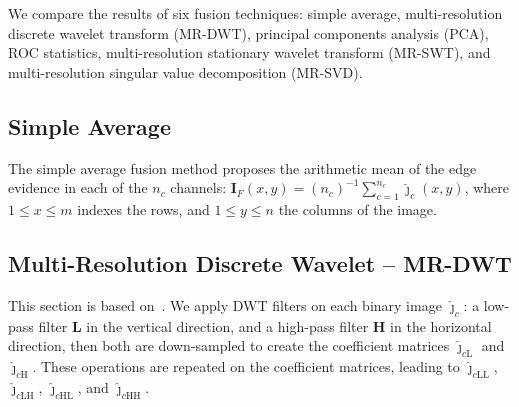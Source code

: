 \documentclass[journal]{IEEEtran}
\begin{document}
We compare the results of six fusion techniques:
simple average, 
multi-resolution discrete wavelet transform (MR-DWT),
principal components analysis (PCA), 
ROC statistics,
multi-resolution stationary wavelet transform (MR-SWT), and
multi-resolution singular value decomposition (MR-SVD).



\subsection{Simple Average}
The simple average fusion method proposes the arithmetic mean of the edge evidence in each of the $n_c$ channels:
$\bm I_F(x,y)=(n_c)^{-1}\sum_{c=1}^{n_c} \widehat{\bm\jmath}_c(x,y)$,
where $1\leq x\leq m$ indexes the rows, and $1\leq y\leq n$ the columns of the image.

\subsection{Multi-Resolution Discrete Wavelet -- MR-DWT} 
This section is based on~\cite{n_r}.
We apply DWT filters on each binary image $\bm{\widehat\jmath}_c$: a low-pass filter $\bm L$ in the vertical direction, and a high-pass filter $\bm H$ in the horizontal direction, then both are down-sampled to create the coefficient matrices $\bm{\widehat\jmath}_{c\text{L}}$ and $\bm{\widehat\jmath}_{c\text{H}}$.
These operations are repeated on the coefficient matrices, leading to $\bm{\widehat\jmath}_{c\text{LL}}$, $\bm{\widehat\jmath}_{c\text{LH}}$, $\bm{\widehat\jmath}_{c\text{HL}}$, and $\bm{\widehat\jmath}_{c\text{HH}}$.
\end{document}
